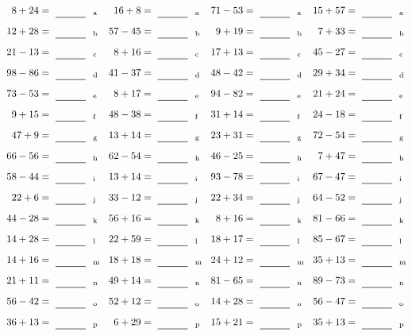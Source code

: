 \documentclass
[
  draft    = true,
  fontsize = 11pt,
  parskip  = half-
]
{scrartcl}
\begin{document}
\clearpage
\begin{align*}
    \pline{8+24}&=\rline{a}
  & \pline{16+8}&=\rline{a}
  & \pline{71-53}&=\rline{a}
  & \pline{15+57}&=\rline{a} \\[1ex]
    \pline{12+28}&=\rline{b}
  & \pline{57-45}&=\rline{b}
  & \pline{9+19}&=\rline{b}
  & \pline{7+33}&=\rline{b} \\[1ex]
    \pline{21-13}&=\rline{c}
  & \pline{8+16}&=\rline{c}
  & \pline{17+13}&=\rline{c}
  & \pline{45-27}&=\rline{c} \\[1ex]
    \pline{98-86}&=\rline{d}
  & \pline{41-37}&=\rline{d}
  & \pline{48-42}&=\rline{d}
  & \pline{29+34}&=\rline{d} \\[1ex]
    \pline{73-53}&=\rline{e}
  & \pline{8+17}&=\rline{e}
  & \pline{94-82}&=\rline{e}
  & \pline{21+24}&=\rline{e} \\[1ex]
    \pline{9+15}&=\rline{f}
  & \pline{48-38}&=\rline{f}
  & \pline{31+14}&=\rline{f}
  & \pline{24-18}&=\rline{f} \\[1ex]
    \pline{47+9}&=\rline{g}
  & \pline{13+14}&=\rline{g}
  & \pline{23+31}&=\rline{g}
  & \pline{72-54}&=\rline{g} \\[1ex]
    \pline{66-56}&=\rline{h}
  & \pline{62-54}&=\rline{h}
  & \pline{46-25}&=\rline{h}
  & \pline{7+47}&=\rline{h} \\[1ex]
    \pline{58-44}&=\rline{i}
  & \pline{13+14}&=\rline{i}
  & \pline{93-78}&=\rline{i}
  & \pline{67-47}&=\rline{i} \\[1ex]
    \pline{22+6}&=\rline{j}
  & \pline{33-12}&=\rline{j}
  & \pline{22+34}&=\rline{j}
  & \pline{64-52}&=\rline{j} \\[1ex]
    \pline{44-28}&=\rline{k}
  & \pline{56+16}&=\rline{k}
  & \pline{8+16}&=\rline{k}
  & \pline{81-66}&=\rline{k} \\[1ex]
    \pline{14+28}&=\rline{l}
  & \pline{22+59}&=\rline{l}
  & \pline{18+17}&=\rline{l}
  & \pline{85-67}&=\rline{l} \\[1ex]
    \pline{14+16}&=\rline{m}
  & \pline{18+18}&=\rline{m}
  & \pline{24+12}&=\rline{m}
  & \pline{35+13}&=\rline{m} \\[1ex]
    \pline{21+11}&=\rline{n}
  & \pline{49+14}&=\rline{n}
  & \pline{81-65}&=\rline{n}
  & \pline{89-73}&=\rline{n} \\[1ex]
    \pline{56-42}&=\rline{o}
  & \pline{52+12}&=\rline{o}
  & \pline{14+28}&=\rline{o}
  & \pline{56-47}&=\rline{o} \\[1ex]
    \pline{36+13}&=\rline{p}
  & \pline{6+29}&=\rline{p}
  & \pline{15+21}&=\rline{p}
  & \pline{35+13}&=\rline{p}
\end{align*}
\end{document}
